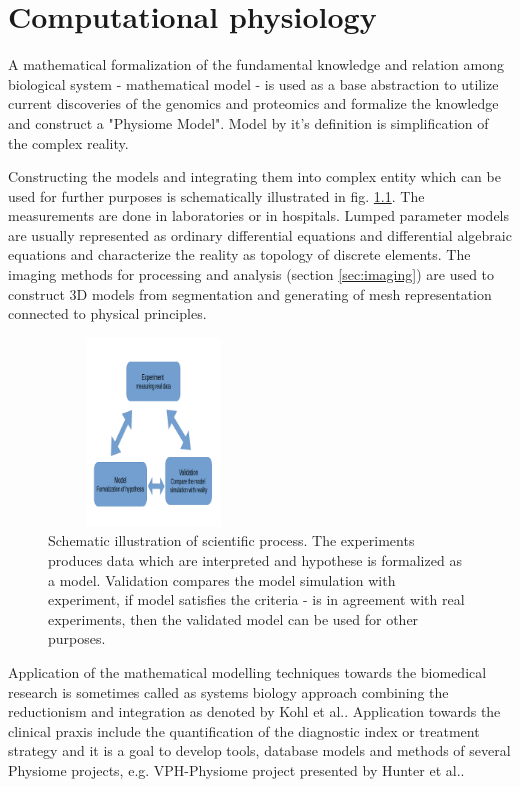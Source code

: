 \chapter{Computational physiology}
\label{sec:models}
A mathematical formalization of the fundamental knowledge and relation among biological system - mathematical model - is used as a base abstraction to utilize current discoveries of the genomics and proteomics and formalize the knowledge and construct a "Physiome Model". Model by it's definition is simplification of the complex reality.

Constructing the models and integrating them into complex entity which can be used for further purposes is schematically illustrated in fig. \ref{fig:modeling}. The measurements are done in laboratories or in hospitals. Lumped parameter models are usually represented as ordinary differential equations and differential algebraic equations and characterize the reality as topology of discrete elements. The imaging methods for processing and analysis (section \ref{sec:imaging}) are used to construct 3D models from segmentation and generating of mesh representation connected to physical principles. 
\begin{figure}[ht]
    \centering
    \includegraphics[width=0.5\textwidth, height=5cm]{chapter6/modeling.png}
    \caption{Schematic illustration of scientific process. The experiments produces data which are interpreted and hypothese is formalized as a model. Validation compares the model simulation with experiment, if model satisfies the criteria - is in agreement with real experiments, then the validated model can be used for other purposes.  %
    }
    \label{fig:modeling}
\end{figure}

Application of the mathematical modelling techniques towards the biomedical research is sometimes called as systems biology approach combining the reductionism and integration as denoted by Kohl et al.\cite{Kohl2010}. Application towards the clinical praxis include the quantification of the diagnostic index or treatment strategy and it is a goal to develop tools, database models and methods of several Physiome projects, e.g. VPH-Physiome project presented by Hunter et al.\cite{Hunter2009}.


